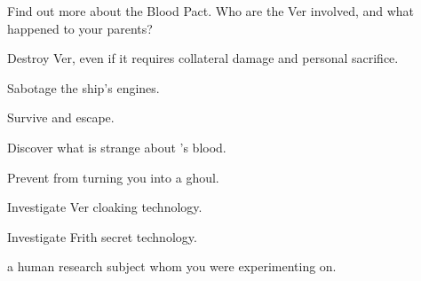 \documentclass[char]{guildcamp4}
\begin{document}
\begin{itemz}[Goals]
	\item Find out more about the Blood Pact. Who are the Ver involved, and what happened to your parents?
	\item Destroy Ver, even if it requires collateral damage and personal sacrifice.
	\item Sabotage the ship's engines.
	\item Survive and escape.
	\item Discover what is strange about \cPlead{}'s blood.
	\item Prevent \cVone{} from turning you into a ghoul.
	\item Investigate Ver cloaking technology.
	\item Investigate Frith secret technology.
\end{itemz}

\begin{contacts}
	\contact{\cPlead{}} a human research subject whom you were experimenting on. 
\end{contacts}
\end{document}
